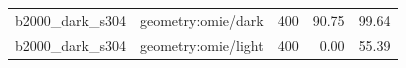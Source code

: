 \begin{longtable}{l>{\raggedright\arraybackslash}p{.42\linewidth}rrr}
b2000\_\allowbreak{}dark\_\allowbreak{}s304 & %
geometry:omie/dark & %
400 & %
90.75 & %
99.64 \\ %

b2000\_\allowbreak{}dark\_\allowbreak{}s304 & %
geometry:omie/light & %
400 & %
0.00 & %
55.39 \\ %


\end{longtable}

